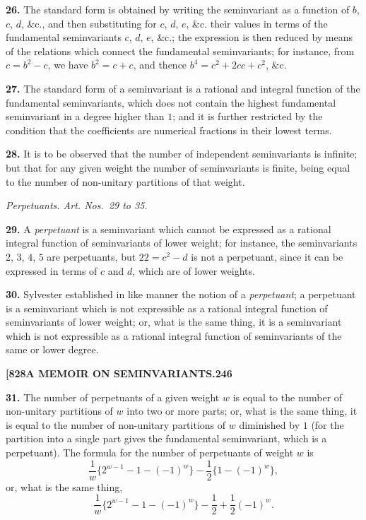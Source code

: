 \documentclass[12pt,a4paper]{article}
\theoremstyle{definition}
\begin{document}
\noindent\textbf{26.} The standard form is obtained by writing the seminvariant as a function of $b$, $c$, $d$, \&c., and then substituting for $c$, $d$, $e$, \&c. their values in terms of the fundamental seminvariants $c$, $d$, $e$, \&c.; the expression is then reduced by means of the relations which connect the fundamental seminvariants; for instance, from $c = b^2 - c$, we have $b^2 = c + c$, and thence $b^4 = c^2 + 2cc + c^2$, \&c.

\noindent\textbf{27.} The standard form of a seminvariant is a rational and integral function of the fundamental seminvariants, which does not contain the highest fundamental seminvariant in a degree higher than $1$; and it is further restricted by the condition that the coefficients are numerical fractions in their lowest terms.

\noindent\textbf{28.} It is to be observed that the number of independent seminvariants is infinite; but that for any given weight the number of seminvariants is finite, being equal to the number of non-unitary partitions of that weight.

\begin{center}
\textit{Perpetuants. Art. Nos.~29 to 35.}
\end{center}

\noindent\textbf{29.} A \textit{perpetuant} is a seminvariant which cannot be expressed as a rational integral function of seminvariants of lower weight; for instance, the seminvariants $2$, $3$, $4$, $5$ are perpetuants, but $22 = c^2 - d$ is not a perpetuant, since it can be expressed in terms of $c$ and $d$, which are of lower weights.

\noindent\textbf{30.} Sylvester established in like manner the notion of a \textit{perpetuant}; a perpetuant is a seminvariant which is not expressible as a rational integral function of seminvariants of lower weight; or, what is the same thing, it is a seminvariant which is not expressible as a rational integral function of seminvariants of the same or lower degree.

\newpage
\setcounter{page}{246}

\noindent\textbf{[828}\hfill\textbf{A MEMOIR ON SEMINVARIANTS.}\hfill\textbf{246}

\bigskip

\noindent\textbf{31.} The number of perpetuants of a given weight $w$ is equal to the number of non-unitary partitions of $w$ into two or more parts; or, what is the same thing, it is equal to the number of non-unitary partitions of $w$ diminished by $1$ (for the partition into a single part gives the fundamental seminvariant, which is a perpetuant). The formula for the number of perpetuants of weight $w$ is
\[
\frac{1}{w}\{2^{w-1} - 1 - (-1)^w\} - \frac{1}{2}\{1 - (-1)^w\},
\]
or, what is the same thing,
\[
\frac{1}{w}\{2^{w-1} - 1 - (-1)^w\} - \frac{1}{2} + \frac{1}{2}(-1)^w.
\]
\end{document}
